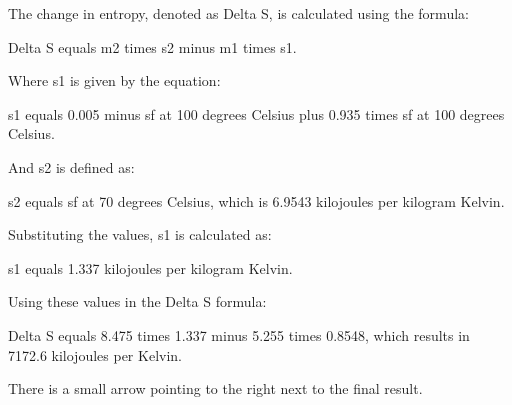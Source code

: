 The change in entropy, denoted as Delta S, is calculated using the formula:

Delta S equals m2 times s2 minus m1 times s1.

Where s1 is given by the equation:

s1 equals 0.005 minus sf at 100 degrees Celsius plus 0.935 times sf at 100 degrees Celsius.

And s2 is defined as:

s2 equals sf at 70 degrees Celsius, which is 6.9543 kilojoules per kilogram Kelvin.

Substituting the values, s1 is calculated as:

s1 equals 1.337 kilojoules per kilogram Kelvin.

Using these values in the Delta S formula:

Delta S equals 8.475 times 1.337 minus 5.255 times 0.8548, which results in 7172.6 kilojoules per Kelvin.

There is a small arrow pointing to the right next to the final result.